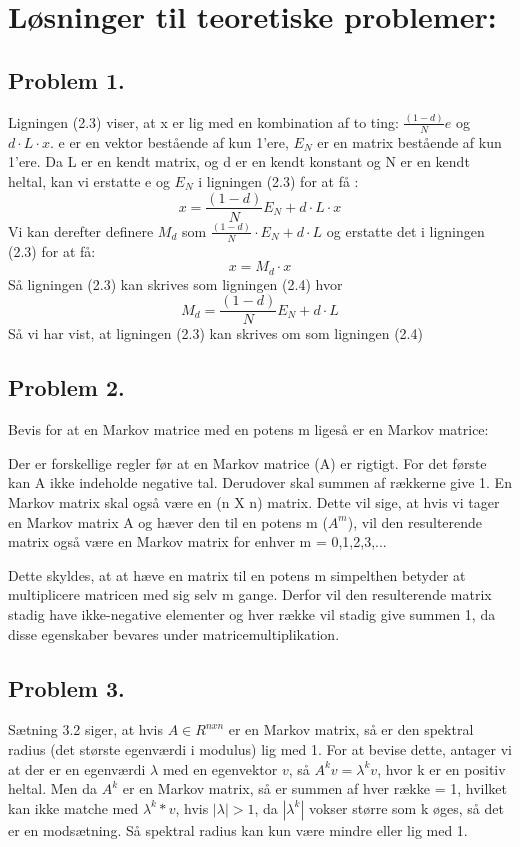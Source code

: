 
\section{Løsninger til teoretiske problemer:}


\subsection*{Problem 1.}

Ligningen (2.3) viser, at x er lig med en kombination af to ting: $\frac{(1-d)}{N}e$ og $d\cdot L\cdot x$. e er en vektor bestående af kun 1'ere, $E_N$ er en matrix bestående af kun 1'ere.
Da L er en kendt matrix, og d er en kendt konstant og N er en kendt heltal, kan vi erstatte e og $E_N$ i ligningen (2.3) for at få :
$$x = \frac{(1-d)}{N}E_N + d\cdot L\cdot x$$
Vi kan derefter definere $M_d$ som $\frac{(1-d)}{N} \cdot E_N + d \cdot L$
og erstatte det i ligningen (2.3) for at få:
$$x = M_d \cdot x$$
Så ligningen (2.3) kan skrives som ligningen (2.4) hvor $$M_d = \frac{(1-d)}{N}E_N + d \cdot L$$
Så vi har vist, at ligningen (2.3) kan skrives om som ligningen (2.4)



\subsection*{Problem 2.}

Bevis for at en Markov matrice med en potens m ligeså er en Markov matrice:

Der er forskellige regler før at en Markov matrice (A) er rigtigt. For det første kan A ikke indeholde negative tal. Derudover skal summen af rækkerne give 1. En Markov matrix skal også være en (n X n) matrix. Dette vil sige, at hvis vi tager en Markov matrix A og hæver den til en potens m ($A^m$), vil den resulterende matrix også være en Markov matrix for enhver m = 0,1,2,3,...

Dette skyldes, at at hæve en matrix til en potens m simpelthen betyder at multiplicere matricen med sig selv m gange. Derfor vil den resulterende matrix stadig have ikke-negative elementer og hver række vil stadig give summen 1, da disse egenskaber bevares under matricemultiplikation.

\subsection*{Problem 3.}

Sætning 3.2 siger, at hvis $A \in R^{nxn}$ er en Markov matrix, så er den spektral radius (det største egenværdi i modulus) lig med 1. For at bevise dette, antager vi at der er en egenværdi $\lambda$ med en egenvektor $v$, så $A^kv = \lambda^kv$, hvor k er en positiv heltal. Men da $A^k$ er en Markov matrix, så er summen af hver række = 1, hvilket kan ikke matche med $\lambda^k*v$, hvis $|\lambda| > 1$, da $|\lambda^k|$ vokser større som k øges, så det er en modsætning. Så spektral radius kan kun være mindre eller lig med 1.

